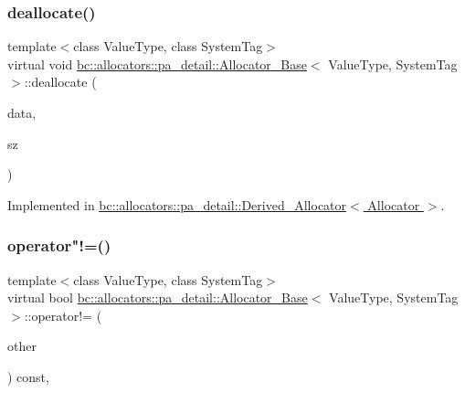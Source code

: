 \subsubsection{\texorpdfstring{deallocate()}{deallocate()}}
{\footnotesize\ttfamily template$<$class Value\+Type, class System\+Tag$>$ \\
virtual void \hyperlink{structbc_1_1allocators_1_1pa__detail_1_1Allocator__Base}{bc\+::allocators\+::pa\+\_\+detail\+::\+Allocator\+\_\+\+Base}$<$ Value\+Type, System\+Tag $>$\+::deallocate (\begin{DoxyParamCaption}\item[{\hyperlink{structbc_1_1allocators_1_1pa__detail_1_1Allocator__Base_afb5e955c647a4b6742010e2790398b1c}{value\+\_\+type} $\ast$}]{data,  }\item[{std\+::size\+\_\+t}]{sz }\end{DoxyParamCaption})\hspace{0.3cm}{\ttfamily [pure virtual]}}



Implemented in \hyperlink{structbc_1_1allocators_1_1pa__detail_1_1Derived__Allocator_a14b837c6cc64fe049f9c18d219e13cf5}{bc\+::allocators\+::pa\+\_\+detail\+::\+Derived\+\_\+\+Allocator$<$ Allocator $>$}.

\mbox{\label{structbc_1_1allocators_1_1pa__detail_1_1Allocator__Base_af752625f3178c2ed57515e0607fbec0e}} 
\subsubsection{\texorpdfstring{operator"!=()}{operator!=()}}
{\footnotesize\ttfamily template$<$class Value\+Type, class System\+Tag$>$ \\
virtual bool \hyperlink{structbc_1_1allocators_1_1pa__detail_1_1Allocator__Base}{bc\+::allocators\+::pa\+\_\+detail\+::\+Allocator\+\_\+\+Base}$<$ Value\+Type, System\+Tag $>$\+::operator!= (\begin{DoxyParamCaption}\item[{const \hyperlink{structbc_1_1allocators_1_1pa__detail_1_1Allocator__Base}{Allocator\+\_\+\+Base}$<$ Value\+Type, System\+Tag $>$ \&}]{other }\end{DoxyParamCaption}) const\hspace{0.3cm}{\ttfamily [inline]}, {\ttfamily [virtual]}}

